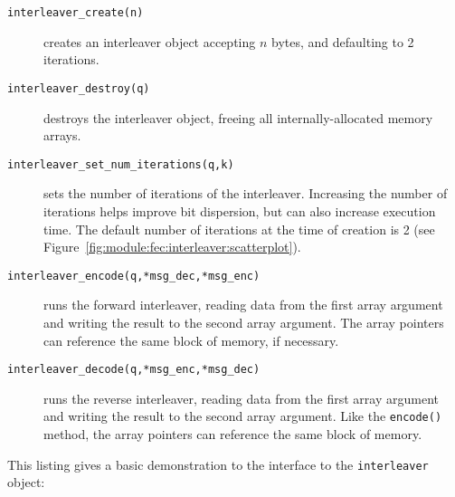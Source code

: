 \begin{description}
\item[{\tt interleaver\_create(n)}]
    creates an interleaver object accepting $n$ bytes,
    and defaulting to 2 iterations.
\item[{\tt interleaver\_destroy(q)}]
    destroys the interleaver object, freeing all internally-allocated
    memory arrays.
\item[{\tt interleaver\_set\_num\_iterations(q,k)}]
    sets the number of iterations of the interleaver.
    Increasing the number of iterations helps improve bit dispersion, but can
    also increase execution time.
    The default number of iterations at the time of creation is 2 (see
    Figure~\ref{fig:module:fec:interleaver:scatterplot}).
\item[{\tt interleaver\_encode(q,*msg\_dec,*msg\_enc)}]
    runs the forward interleaver, reading data from the first array argument
    and writing the result to the second array argument.
    The array pointers can reference the same block of memory, if necessary.
\item[{\tt interleaver\_decode(q,*msg\_enc,*msg\_dec)}]
    runs the reverse interleaver, reading data from the first array argument
    and writing the result to the second array argument.
    Like the {\tt encode()} method, the array pointers can reference the same
    block of memory.
\end{description}
%
This listing gives a basic demonstration to the interface to the
{\tt interleaver} object:
%


